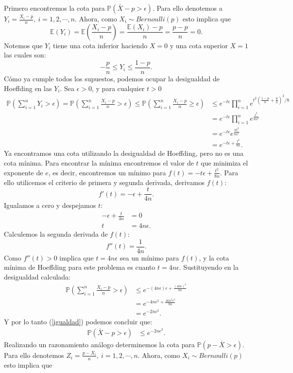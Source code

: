 \documentclass[11pt,letterpaper]{article}
\newcommand{\mP}{\mathbb{P}}
\newcommand{\mE}{\mathbb{E}}
\begin{document}
Primero encontremos la cota para  $\mP(\bar{X}-p>\epsilon)$. Para ello denotemos a $Y_i=\frac{X_i-p}{n}, \ i=1,2,\cdots,n.$ Ahora, como $X_i\sim Bernoulli(p)$ esto implica que
$$\mE(Y_i)=\mE\left(\frac{X_i-p}{n} \right)=\frac{\mE(X_i)-p}{n}=\frac{p-p}{n}=0.$$
Notemos que $Y_i$ tiene una cota inferior haciendo $X=0$ y una cota superior $X=1$ las cuales son:
$$-\frac{p}{n}\leq Y_i \leq \frac{1-p}{n}.$$
Cómo ya cumple todos los supuestos, podemos ocupar la desigualdad de Hoeffding en las $Y_i$. Sea $\epsilon>0$, y para cualquier $t>0$ 
\begin{align*}
\mP\left(\sum_{i=1}^nY_i>\epsilon\right)=\mP\left(\sum_{i=1}^n\frac{X_i-p}{n}>\epsilon\right)\leq \mP\left(\sum_{i=1}^n\frac{X_i-p}{n}\geq\epsilon\right) &\leq e^{-t\epsilon}\prod_{i=1}^n e^{t^2(\frac{1-p}{n}+\frac{p}{n})^2/8}\\
&=e^{-t\epsilon}\prod_{i=1}^n e^{\frac{t^2}{8n^2}}\\
&=e^{-t\epsilon} e^{\frac{nt^2}{8n^2}}\\
&=e^{-t\epsilon+\frac{t^2}{8n}}.
\end{align*}
Ya encontramos una cota utilizando la desigualdad de Hoeffding, pero no es una cota mínima. Para encontrar la mínima encontremos el valor de $t$ que minimiza el exponente de $e$, es decir, encontremos un mínimo para $f(t)=-t\epsilon+\frac{t^2}{8n}.$ Para ello utilicemos el criterio de primera y segunda derivada, derivamos $f(t)$:
$$f'(t)=-\epsilon +\frac{t}{4n}.$$
Igualamos a cero y despejamos $t$:
\begin{align*}
-\epsilon +\frac{t}{4n} &= 0\\
t&=4n\epsilon.
\end{align*}
Calculemos la segunda derivada de $f(t)$:
$$f''(t)=\frac{1}{4n}.$$
Como $f''(t)>0$ implica que $t=4n\epsilon$ sea un mínimo para $f(t)$, y la cota mínima de Hoeffding para este problema es cuanto $t=4n\epsilon$. Sustituyendo en la desigualdad calculada:
\begin{align*}
\mP\left(\sum_{i=1}^n\frac{X_i-p}{n}>\epsilon\right)&\leq e^{-(4n\epsilon)\epsilon+\frac{(4n\epsilon)^2}{8n}}\\
&= e^{-4n\epsilon^2+\frac{16n^2\epsilon^2}{8n}}\\
&= e^{-2n\epsilon^2}.
\end{align*}
Y por lo tanto (\ref{igualdad}) podemos concluir que: 
\begin{align*}
\mP\left(\bar{X}-p>\epsilon\right)&\leq e^{-2n\epsilon^2}.
\end{align*}
Realizando un razonamiento análogo determinemos la cota para $\mP\left(p-\bar{X}>\epsilon\right)$. Para ello denotemos $Z_i=\frac{p-X_i}{n}, \ i=1,2,\cdots,n.$ Ahora, como $X_i\sim Bernoulli(p)$ esto implica que
\end{document}
